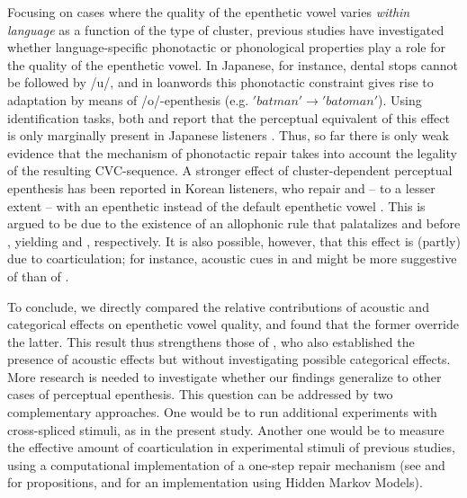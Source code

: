 Focusing on cases where the quality of the epenthetic vowel varies \textit{within language} as a function of the type of cluster, previous studies have investigated whether language-specific phonotactic or phonological properties play a role for the quality of the epenthetic vowel. In Japanese, for instance, dental stops cannot be followed by /u/, and in loanwords this phonotactic constraint gives rise to adaptation by means of /o/-epenthesis (e.g. $'batman' \rightarrow 'batoman'$). Using identification tasks, both \cite{mattingley2015} and \cite{guekozIS17} report that the perceptual equivalent of this effect is only marginally present in Japanese listeners \cite[10-12\% of /o/-epenthesis in /d/-initial clusters; see also][for the absence of such an effect in a discrimination task]{monahan2009}. Thus, so far there is only weak evidence that the mechanism of phonotactic repair takes into account the legality of the resulting CVC-sequence. A stronger effect of cluster-dependent perceptual epenthesis has been reported in Korean listeners, who repair  and -- to a lesser extent --  with an epenthetic  instead of the default epenthetic vowel  \cite{durvasula2015}. This is argued to be due to the existence of an allophonic rule that palatalizes  and  before , yielding \textipa{[Si]} and \textipa{[c\super hi]}, respectively. It is also possible, however, that this effect is (partly) due to coarticulation; for instance, acoustic cues in  and  might be more suggestive of  than of .  

To conclude, we directly compared the relative contributions of acoustic and categorical effects on epenthetic vowel quality, and found that the former override the latter. This result thus strengthens those of \cite{dupoux2011}, who also established the presence of acoustic effects but without investigating possible categorical effects. More research is needed to investigate whether our findings generalize to other cases of perceptual epenthesis. This question can be addressed by two complementary approaches. One would be to run additional experiments with cross-spliced stimuli, as in the present study. Another one would be to measure the effective amount of coarticulation in experimental stimuli of previous studies, using a computational implementation of a one-step repair mechanism (see \cite{dupoux2011} and \cite{wilson2014} for propositions, and \cite{schatz2016} for an implementation using Hidden Markov Models).

